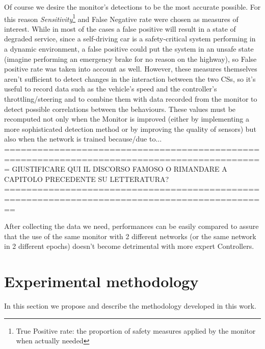 Of course we desire the monitor's detections to be the most accurate possible. For this reason \textsl{Sensitivity}\footnote{True Positive rate: the proportion of safety measures applied by the monitor when actually needed} and False Negative rate were chosen as measures of interest.\newline
While in most of the cases a false positive will result in a state of degraded service, since a self-driving car is a safety-critical system performing in a dynamic environment, a false positive could put the system in an unsafe state (imagine performing an emergency brake for no reason on the highway), so False positive rate was taken into account as well.\newline
However, these measures themselves aren't sufficient to detect changes in the interaction between the two CSs, so it's useful to record data such as the vehicle's speed and the controller's throttling/steering and to combine them with data recorded from the monitor to detect possible correlations between the behaviours.
These values must be recomputed not only when the Monitor is improved (either by implementing a more sophisticated detection method or by improving the quality of sensors) but also when the network is trained because/due to...
=============================================================================================
GIUSTIFICARE QUI IL DISCORSO FAMOSO O RIMANDARE A CAPITOLO PRECEDENTE SU LETTERATURA?
==============================================================================================

After collecting the data we need, performances can be easily compared to assure that the use of the same monitor with 2 different networks (or the same network in 2 different epochs) doesn't become detrimental with more expert Controllers.

\section{Experimental methodology}

In this section we propose and describe the methodology developed in this work.\newline

